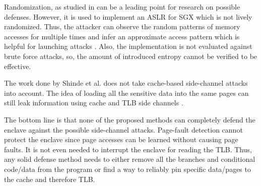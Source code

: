 Randomization, as studied in \cite{sgxshield} can be a leading point for research on possible defenses. However, it is used to implement an ASLR for SGX which is not lively randomized. Thus, the attacker can observe the random patterns of memory accesses for multiple times and infer an approximate access pattern which is helpful for launching attacks \cite{leakycauldron}. Also, the implementation is not evaluated against brute force attacks, so, the amount of introduced entropy cannot be verified to be effective.

The work done by Shinde et al. \cite{pigeonhole} does not take cache-based side-channel attacks into account. The idea of loading all the sensitive data into the same pages can still leak information using cache and TLB side channels \cite{leakycauldron}.

The bottom line is that none of the proposed methods can completely defend the enclave against the possible side-channel attacks. Page-fault detection cannot protect the enclave since page accesses can be learned without causing page faults. It is not even needed to interrupt the enclave for reading the TLB. Thus, any solid defense method needs to either remove all the branches and conditional code/data from the program or find a way to reliably pin specific data/pages to the cache and therefore TLB.


